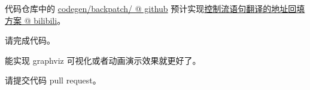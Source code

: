 \documentclass[a4paper, justified]{tufte-handout}
\begin{document}
\begin{solution}
\end{solution}

\begin{problem}
  代码仓库中的
  \href{https://github.com/courses-at-nju-by-hfwei/2024-compilers-coding/tree/main/src/main/java/codegen/backpatch}{codegen/backpatch/ @ github}
  预计实现\href{https://www.bilibili.com/video/BV1aJ4m1N7ZF/?spm_id_from=333.788&vd_source=e3cbbf5ca80db268fa006d63626e267e}{控制流语句翻译的地址回填方案 @ bilibili}。

  \noindent 请完成代码。

  \noindent 能实现 graphviz 可视化或者动画演示效果就更好了。

  \noindent 请提交代码 pull request。
\end{problem}

\begin{solution}
\end{solution}




\end{document}
